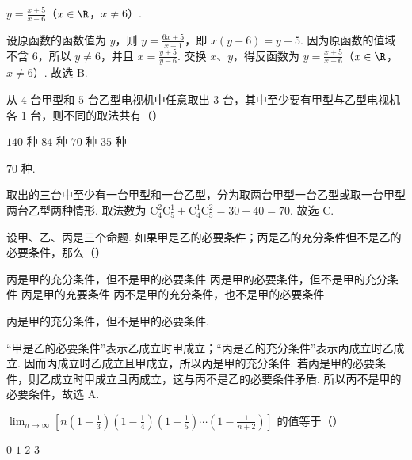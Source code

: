 \documentclass[UTF8,a4paper,oneside,11pt]{ctexbook}
\begin{document}
\begin{answer}
\(y=\frac{x+5}{x-6}\)（\(x\in\R\)，\(x\neq6\)）.
\end{answer}

\begin{solution}
设原函数的函数值为 \(y\)，则 \(y=\frac{6x+5}{x-1}\)，即 \(x(y-6)=y+5\). 因为原函数的值域不含 \(6\)，所以 \(y\neq6\)，并且 \(x=\frac{y+5}{y-6}\). 交换 \(x\)、\(y\)，得反函数为 \(y=\frac{x+5}{x-6}\)（\(x\in\R\)，\(x\neq6\)）. 故选 B.
\end{solution}

\begin{problem}
从 \(4\) 台甲型和 \(5\) 台乙型电视机中任意取出 \(3\) 台，其中至少要有甲型与乙型电视机各 \(1\) 台，则不同的取法共有（\quad）

\choices
    {\(140\) 种}
    {\(84\) 种}
    {\(70\) 种}
    {\(35\) 种}
\end{problem}

\begin{answer}
\(70\) 种.
\end{answer}

\begin{solution}
取出的三台中至少有一台甲型和一台乙型，分为取两台甲型一台乙型或取一台甲型两台乙型两种情形. 取法数为 \(\mathrm C_4^2\mathrm C_5^1+\mathrm C_4^1\mathrm C_5^2=30+40=70\). 故选 C.
\end{solution}

\begin{problem}
设甲、乙、丙是三个命题. 如果甲是乙的必要条件；丙是乙的充分条件但不是乙的必要条件，那么（\quad）

\choices
    {丙是甲的充分条件，但不是甲的必要条件}
    {丙是甲的必要条件，但不是甲的充分条件}
    {丙是甲的充要条件}
    {丙不是甲的充分条件，也不是甲的必要条件}
\end{problem}

\begin{answer}
丙是甲的充分条件，但不是甲的必要条件.
\end{answer}

\begin{solution}
“甲是乙的必要条件”表示乙成立时甲成立；“丙是乙的充分条件”表示丙成立时乙成立. 因而丙成立时乙成立且甲成立，所以丙是甲的充分条件. 若丙是甲的必要条件，则乙成立时甲成立且丙成立，这与丙不是乙的必要条件矛盾. 所以丙不是甲的必要条件，故选 A.
\end{solution}

\begin{problem}
\(\displaystyle\lim_{n\to \infty}\left[n\left(1 - \frac{1}{3}\right)\left(1 - \frac{1}{4}\right)\left(1 - \frac{1}{5}\right)\cdots \left(1 - \frac{1}{n + 2}\right)\right]\) 的值等于（\quad）

\choices
    {\(0\)}
    {\(1\)}
    {\(2\)}
    {\(3\)}
\end{problem}
\end{document}

